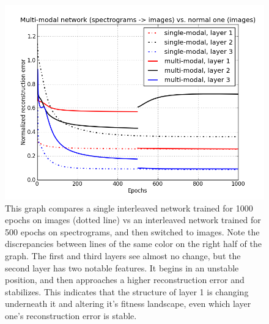 \documentclass[12pt]{article}
\begin{document}
\begin{doublespacing}
\begin{figure}[p]
\centering
\includegraphics[width=6in]{graph_im_multi}
\caption{This graph compares a single interleaved network trained for 1000 epochs on images (dotted line) vs an interleaved network trained for 500 epochs on spectrograms, and then switched to images. Note the discrepancies between lines of the same color on the right half of the graph. The first and third layers see almost no change, but the second layer has two notable features. It begins in an unstable position, and then approaches a higher reconstruction error and stabilizes. This indicates that the structure of layer 1 is changing underneath it and altering it's fitness landscape, even which layer one's reconstruction error is stable.}
\label{fig:graph_im_multi}
\end{figure}


\end{doublespacing}
\end{document}
